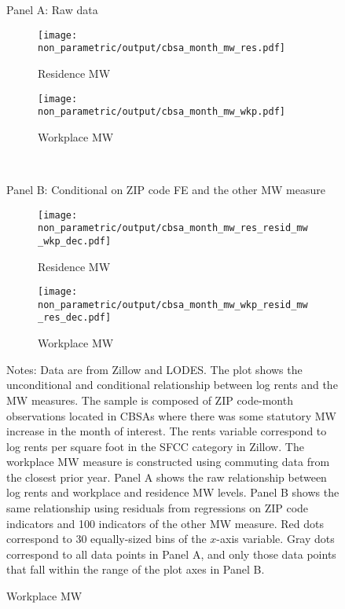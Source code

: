 \begin{figure}[htb!]
    \centering
    \caption{Relationship between log rents and the minimum wage measures, 
             sample of affected ZIP code-months}
    \label{fig:non_parametric}
    
    \begin{minipage}{.95\textwidth} \centering
        Panel A: Raw data
        \vspace{1mm}
    \end{minipage}
    \begin{subfigure}{0.5\textwidth}
        \caption*{Residence MW}
        \texttt{[image: non\_parametric/output/cbsa\_month\_mw\_res.pdf]}
    \end{subfigure}%
    \begin{subfigure}{0.5\textwidth}
        \caption*{Workplace MW}
        \texttt{[image: non\_parametric/output/cbsa\_month\_mw\_wkp.pdf]}
    \end{subfigure}\\

    \vspace{2mm}
    \begin{minipage}{.95\textwidth} \centering
        Panel B: Conditional on ZIP code FE and the other MW measure
        \vspace{1mm}
    \end{minipage}
    \begin{subfigure}{0.5\textwidth}
        \caption*{Residence MW}
        \texttt{[image: non\_parametric/output/cbsa\_month\_mw\_res\_resid\_mw\_wkp\_dec.pdf]}
    \end{subfigure}%
    \begin{subfigure}{0.5\textwidth}
        \caption*{Workplace MW}
        \texttt{[image: non\_parametric/output/cbsa\_month\_mw\_wkp\_resid\_mw\_res\_dec.pdf]}
    \end{subfigure}

    \begin{minipage}{.95\textwidth} \footnotesize
        \vspace{3mm}
        Notes:
        Data are from Zillow and LODES.
        The plot shows the unconditional and conditional relationship between 
        log rents and the MW measures.
        The sample is composed of ZIP code-month observations located in CBSAs 
        where there was some statutory MW increase in the month of interest. 
        The rents variable correspond to log rents per square foot in the SFCC 
        category in Zillow.
        The workplace MW measure is constructed using commuting data from the 
        closest prior year.
        Panel A shows the raw relationship between log rents and workplace 
        and residence MW levels.
        Panel B shows the same relationship using residuals from regressions 
        on ZIP code indicators and 100 indicators of the other MW measure.
        Red dots correspond to 30 equally-sized bins of the $x$-axis variable.
        Gray dots correspond to all data points in Panel A, and only those 
        data points that fall within the range of the plot axes in Panel B.
    \end{minipage}
\end{figure}

